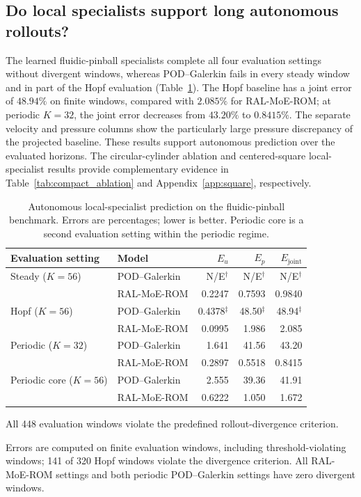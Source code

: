 \subsection{Do local specialists support long autonomous rollouts?}

The learned fluidic-pinball specialists complete all four evaluation settings
without divergent windows, whereas POD--Galerkin fails in every steady window
and in part of the Hopf evaluation (Table~\ref{tab:pinball_autonomous}).
The Hopf baseline has a joint error of $48.94\%$ on finite windows, compared
with $2.085\%$ for RAL-MoE-ROM; at periodic $K=32$, the joint error decreases
from $43.20\%$ to $0.8415\%$. The separate velocity and pressure columns
show the particularly large pressure discrepancy of the projected baseline.
These results support autonomous prediction over the evaluated horizons.
The circular-cylinder ablation and centered-square local-specialist results
provide complementary evidence in Table~\ref{tab:compact_ablation} and
Appendix~\ref{app:square}, respectively.

\begin{table}[t]
\centering
\caption{Autonomous local-specialist prediction on the fluidic-pinball benchmark.
Errors are percentages; lower is better. Periodic core is a second evaluation setting
within the periodic regime.}
\label{tab:pinball_autonomous}
\small
\setlength{\tabcolsep}{5pt}
\begin{threeparttable}
\begin{tabular}{@{}llrrr@{}}
\toprule
Evaluation setting & Model & $E_u$ & $E_p$ & $E_{\mathrm{joint}}$ \\
\midrule
Steady ($K=56$) & POD--Galerkin & N/E$^\dagger$ & N/E$^\dagger$ & N/E$^\dagger$ \\
 & RAL-MoE-ROM & 0.2247 & 0.7593 & 0.9840 \\
\addlinespace
Hopf ($K=56$) & POD--Galerkin & 0.4378$^\ddagger$ & 48.50$^\ddagger$ & 48.94$^\ddagger$ \\
 & RAL-MoE-ROM & 0.0995 & 1.986 & 2.085 \\
\addlinespace
Periodic ($K=32$) & POD--Galerkin & 1.641 & 41.56 & 43.20 \\
 & RAL-MoE-ROM & 0.2897 & 0.5518 & 0.8415 \\
\addlinespace
Periodic core ($K=56$) & POD--Galerkin & 2.555 & 39.36 & 41.91 \\
 & RAL-MoE-ROM & 0.6222 & 1.050 & 1.672 \\
\bottomrule
\end{tabular}
\begin{tablenotes}[flushleft]
\footnotesize
\item[$\dagger$] All 448 evaluation windows violate the predefined rollout-divergence criterion.
\item[$\ddagger$] Errors are computed on finite evaluation windows, including threshold-violating windows; 141 of 320 Hopf windows violate the divergence criterion. All RAL-MoE-ROM settings and both periodic POD--Galerkin settings have zero divergent windows.
\end{tablenotes}
\end{threeparttable}
\end{table}


